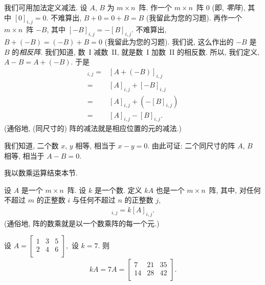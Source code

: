 我们可用加法定义减法.
设 \(A\), \(B\) 为 \(m \times n\)~阵.
作一个 \(m \times n\)~阵 \(0\)
(即, \emph{零阵}),
其中 \([0]_{i,j} = 0\).
不难算出, \(B + 0 = 0 + B = B\)
(我留此为您的习题).
再作一个 \(m \times n\)~阵 \(-B\),
其中 \([-B]_{i,j} = -[B]_{i,j}\).
不难算出, \(B + (-B) = (-B) + B = 0\)
(我留此为您的习题).
我们说, 这么作出的 \(-B\) 是 \(B\) 的\emph{相反阵}.
我们知道, 数~I 减数~II, 就是数~I 加数~II 的相反数.
所以, 我们定义, \(A - B = A + (-B)\).
于是
\begin{align*}
    [A - B]_{i,j}
    = {} & [A + (-B)]_{i,j}         \\
    = {} & [A]_{i,j} + [-B]_{i,j}   \\
    = {} & [A]_{i,j} + (-[B]_{i,j}) \\
    = {} & [A]_{i,j} - [B]_{i,j}.
\end{align*}
(通俗地, (同尺寸的) 阵的减法就是相应位置的元的减法.)

我们知道, 二个数 \(x\), \(y\) 相等,
相当于 \(x - y = 0\).
由此可证:
二个同尺寸的阵 \(A\), \(B\) 相等,
相当于 \(A - B = 0\).

\vspace{2ex}

我以数乘运算结束本节.

\begin{definition}[阵的数乘]
    设 \(A\) 是一个 \(m \times n\)~阵.
    设 \(k\) 是一个数.
    定义 \(kA\) 也是一个 \(m \times n\)~阵,
    其中, 对任何不超过 \(m\) 的正整数 \(i\)
    与任何不超过 \(n\) 的正整数 \(j\),
    \begin{align*}
        [kA]_{i,j} = k[A]_{i,j}.
    \end{align*}
    (通俗地, 阵的数乘就是以一个数乘阵的每一个元.)
\end{definition}

\begin{example}
    设
    \(
    A = \begin{bmatrix}
        1 & 3 & 5 \\
        2 & 4 & 6 \\
    \end{bmatrix},
    \)
    设 \(k = 7\).
    则
    \begin{align*}
        kA = 7A =
        \begin{bmatrix}
            7  & 21 & 35 \\
            14 & 28 & 42 \\
        \end{bmatrix}.
    \end{align*}
\end{example}

